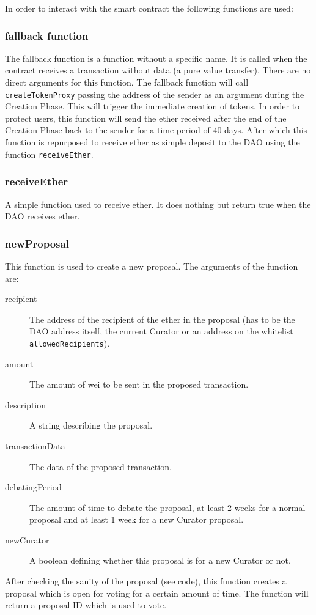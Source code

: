 \documentclass[9pt,oneside]{amsart}
\begin{document}
\begin{multicols}{2}
In order to interact with the smart contract the following functions are used:

\subsubsection*{fallback function}
The fallback function is a function without a specific name. It is called when the contract receives a transaction without data (a pure value transfer). There are no direct arguments for this function.
The fallback function will call \verb|createTokenProxy| passing the address of the sender as an argument during the Creation Phase. This will trigger the immediate creation of tokens. In order to protect users, this function will send the ether received after the end of the Creation Phase back to the sender for a time period of $40$ days. After which this function is repurposed to receive ether as simple deposit to the DAO using the function \verb|receiveEther|.

\subsubsection*{receiveEther}
A simple function used to receive ether. It does nothing but return true when the DAO receives ether.

\subsubsection*{newProposal}
This function is used to create a new proposal. The arguments of the function are:
\begin{description}
 \item[recipient] The address of the recipient of the ether in the proposal (has to be the DAO address itself, the current Curator or an address on the whitelist \verb|allowedRecipients|).
 \item[amount] The amount of wei to be sent in the proposed transaction.
 \item[description] A string describing the proposal.
 \item[transactionData] The data of the proposed transaction.
 \item[debatingPeriod] The amount of time to debate the proposal, at least 2 weeks for a normal proposal and at least 1 week for a new Curator proposal.
 \item[newCurator] A boolean defining whether this proposal is for a new Curator or not.
\end{description}
After checking the sanity of the proposal (see code), this function creates a proposal which is open for voting for a certain amount of time. The function will return a proposal ID which is used to vote.


\end{multicols}
\end{document}
